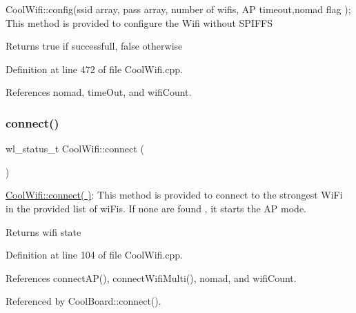 Cool\+Wifi\+::config(ssid array, pass array, number of wifis, A\+P timeout,nomad flag ); This method is provided to configure the Wifi without S\+P\+I\+F\+FS

\begin{DoxyReturn}{Returns}
true if successfull, false otherwise 
\end{DoxyReturn}


Definition at line 472 of file Cool\+Wifi.\+cpp.



References nomad, time\+Out, and wifi\+Count.

\mbox{\label{class_cool_wifi_ad060353050f40d032a2dbf9e54a768bf}} 
\subsubsection{\texorpdfstring{connect()}{connect()}}
{\footnotesize\ttfamily wl\+\_\+status\+\_\+t Cool\+Wifi\+::connect (\begin{DoxyParamCaption}{ }\end{DoxyParamCaption})}

\hyperlink{class_cool_wifi_ad060353050f40d032a2dbf9e54a768bf}{Cool\+Wifi\+::connect( )}\+: This method is provided to connect to the strongest Wi\+Fi in the provided list of wi\+Fis. If none are found , it starts the AP mode.

\begin{DoxyReturn}{Returns}
wifi state 
\end{DoxyReturn}


Definition at line 104 of file Cool\+Wifi.\+cpp.



References connect\+A\+P(), connect\+Wifi\+Multi(), nomad, and wifi\+Count.



Referenced by Cool\+Board\+::connect().

